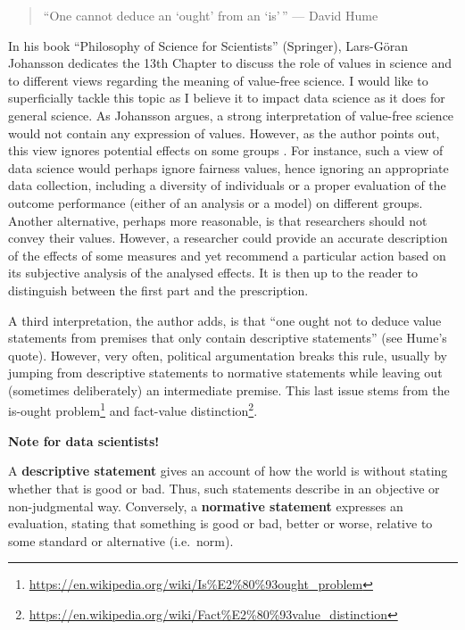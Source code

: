 \documentclass[
  12pt,
]{book}
\DeclareRobustCommand{\href}[2]{#2\footnote{\url{#1}}}
\begin{document}
\begin{quote}
``One cannot deduce an `ought' from an `is'\,'' --- David Hume
\end{quote}

In his book ``Philosophy of Science for Scientists'' (Springer), Lars-Göran Johansson dedicates the 13th Chapter to discuss the role of values in science and to different views regarding the meaning of value-free science. I would like to superficially tackle this topic as I believe it to impact data science as it does for general science. As Johansson argues, a strong interpretation of value-free science would not contain any expression of values. However, as the author points out, this view ignores potential effects on some groups \citep{johansson2016philosophy}. For instance, such a view of data science would perhaps ignore fairness values, hence ignoring an appropriate data collection, including a diversity of individuals or a proper evaluation of the outcome performance (either of an analysis or a model) on different groups. Another alternative, perhaps more reasonable, is that researchers should not convey their values. However, a researcher could provide an accurate description of the effects of some measures and yet recommend a particular action based on its subjective analysis of the analysed effects. It is then up to the reader to distinguish between the first part and the prescription.

A third interpretation, the author adds, is that ``one ought not to deduce value statements from premises that only contain descriptive statements'' (see Hume's quote). However, very often, political argumentation breaks this rule, usually by jumping from descriptive statements to normative statements while leaving out (sometimes deliberately) an intermediate premise. This last issue stems from the \href{https://en.wikipedia.org/wiki/Is\%E2\%80\%93ought_problem}{is-ought problem} and \href{https://en.wikipedia.org/wiki/Fact\%E2\%80\%93value_distinction}{fact-value distinction}.

\begin{tipbox}

\textbf{Note for data scientists!}

A \textbf{descriptive statement} gives an account of how the world is without stating whether that is good or bad. Thus, such statements describe in an objective or non-judgmental way. Conversely, a \textbf{normative statement} expresses an evaluation, stating that something is good or bad, better or worse, relative to some standard or alternative (i.e.~norm).

\end{tipbox}
\end{document}
